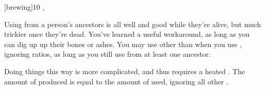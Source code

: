 [brewing]{10}{
	,
}{
	Using  from a person's ancestors is all well and good while they're alive, but much trickier once they're dead.
	You've learned a useful workaround, as long as you can dig up up their bones or ashes.
	You may use  other than  when you use , ignoring ratios, as long as you still use  from at least one ancestor.
	
	Doing things this way is more complicated, and thus requires a heated .
	The amount of  produced is equal to the amount of  used, ignoring all other .
}
